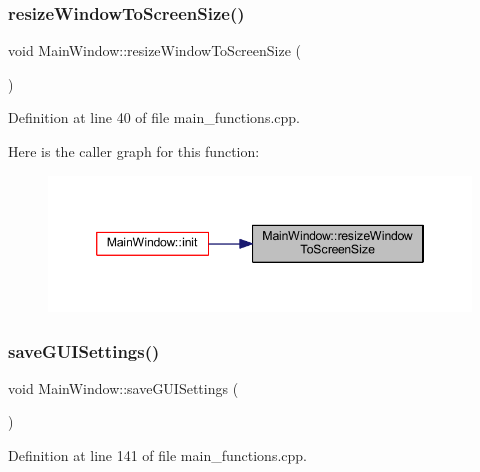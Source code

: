 \subsubsection{\texorpdfstring{resizeWindowToScreenSize()}{resizeWindowToScreenSize()}}
{\footnotesize\ttfamily void Main\+Window\+::resize\+Window\+To\+Screen\+Size (\begin{DoxyParamCaption}{ }\end{DoxyParamCaption})\hspace{0.3cm}{\ttfamily [private]}}



Definition at line 40 of file main\+\_\+functions.\+cpp.

Here is the caller graph for this function\+:
\nopagebreak
\begin{figure}[H]
\begin{center}
\leavevmode
\includegraphics[width=346pt]{classMainWindow_abf8d2aa0872c2072510bc93f9f9e4d11_icgraph}
\end{center}
\end{figure}
\mbox{\label{classMainWindow_a0806c678c7280ab0a786526522f91418}} 
\subsubsection{\texorpdfstring{saveGUISettings()}{saveGUISettings()}}
{\footnotesize\ttfamily void Main\+Window\+::save\+G\+U\+I\+Settings (\begin{DoxyParamCaption}{ }\end{DoxyParamCaption})\hspace{0.3cm}{\ttfamily [private]}}



Definition at line 141 of file main\+\_\+functions.\+cpp.

